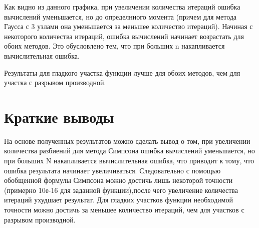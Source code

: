Как видно из данного графика, при увеличении количества итераций ошибка вычислений уменьшается, но до определнного момента (причем для метода Гаусса с 3 узлами она уменьшается за меньшее количество итераций). Начиная с некоторого количества итераций, ошибка вычислений начинает возрастать для обоих методов. Это обусловлено тем, что при больших n накапливается вычислительная ошибка.

Результаты для гладкого участка функции лучше для обоих методов, чем для участка с разрывом производной.

\section{Краткие выводы}

На основе полученных результатов можно сделать вывод о том, при увеличении количества разбиений для метода Симпсона ошибка вычислений уменьшается, но при больших N накапливается вычислительная ошибка, что приводит к тому, что ошибка результата начинает увеличиваться. Следовательно с помощью обобщенной формулы Симпсона можно достичь лишь некоторой точности (примерно 10е-16 для заданной функции),после чего увеличение количества итераций ухудшает результат. Для гладких участков функции необходимой точности можно достичь за меньшее количество итераций, чем для участков с разрывом производной.


